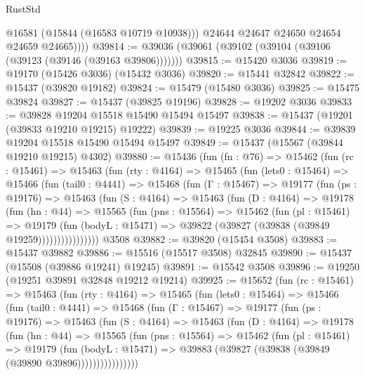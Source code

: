 \begin{lexlean}{RustStd}
\begin{coremodule}
              @16581
              (@15844 (@16583 @10719 @10938)))
            @24644
            @24647
            @24650
            @24654
            @24659
            @24665))))
@39814 := @39036 (@39061 (@39102 (@39104 (@39106 (@39123 (@39146 (@39163 @39806)))))))
@39815 := @15420 @3036
@39819 := @19170 (@15426 @3036) (@15432 @3036)
@39820 := @15441 @32842
@39822 := @15437 (@39820 @19182)
@39824 := @15479 (@15480 @3036)
@39825 := @15475 @39824
@39827 := @15437 (@39825 @19196)
@39828 := @19202 @3036
@39833 := @39828 @19204 @15518 @15490 @15494 @15497
@39838 := @15437 (@19201 (@39833 @19210 @19215) @19222)
@39839 := @19225 @3036
@39844 := @39839 @19204 @15518 @15490 @15494 @15497
@39849 := @15437 (@15567 (@39844 @19210 @19215) @4302)
@39880 := @15436
    (fun (fn : @76) =>
    @15462
      (fun (rc : @15461) =>
      @15463
        (fun (rty : @4164) =>
        @15465
          (fun (lets0 : @15464) =>
          @15466
            (fun (tail0 : @4441) =>
            @15468
              (fun (Γ : @15467) =>
              @19177
                (fun (ps : @19176) =>
                @15463
                  (fun (S : @4164) =>
                  @15463
                    (fun (D : @4164) =>
                    @19178
                      (fun (hn : @44) =>
                      @15565
                        (fun (pns : @15564) =>
                        @15462
                          (fun (pl : @15461) =>
                          @19179
                            (fun (bodyL : @15471) =>
                            @39822 (@39827 (@39838 (@39849 @19259))))))))))))))))
    @3508
@39882 := @39820 (@15454 @3508)
@39883 := @15437 @39882
@39886 := @15516 (@15517 @3508) @32845
@39890 := @15437 (@15508 (@39886 @19241) @19245)
@39891 := @15542 @3508
@39896 := @19250 (@19251 @39891 @32848 @19212 @19214)
@39925 := @15652
    (fun (rc : @15461) =>
    @15463
      (fun (rty : @4164) =>
      @15465
        (fun (lets0 : @15464) =>
        @15466
          (fun (tail0 : @4441) =>
          @15468
            (fun (Γ : @15467) =>
            @19177
              (fun (ps : @19176) =>
              @15463
                (fun (S : @4164) =>
                @15463
                  (fun (D : @4164) =>
                  @19178
                    (fun (hn : @44) =>
                    @15565
                      (fun (pns : @15564) =>
                      @15462
                        (fun (pl : @15461) =>
                        @19179
                          (fun (bodyL : @15471) =>
                          @39883 (@39827 (@39838 (@39849 (@39890 @39896))))))))))))))))

\end{coremodule}
\end{lexlean}
